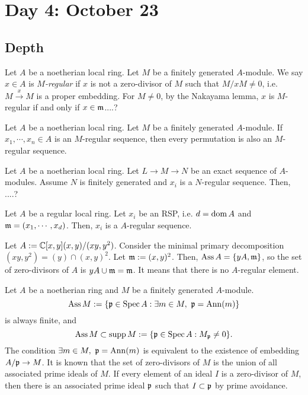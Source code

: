 \documentclass{../../../small}
\newcommand{\Ass}{\operatorname{Ass}}
\newcommand{\Ann}{\operatorname{Ann}}
\begin{document}
\newpage
\section{Day 4: October 23}


\subsection*{Depth}

\begin{defn*}[4.1]
Let $A$ be a noetherian local ring.
Let $M$ be a finitely generated $A$-module.
We say $x\in A$ is \emph{$M$-regular} if $x$ is not a zero-divisor of $M$ such that $M/xM\ne0$, i.e.~$M\xrightarrow{x}M$ is a proper embedding.
For $M\ne0$, by the Nakayama lemma, $x$ is $M$-regular if and only if $x\in\mathfrak{m}$....?

\end{defn*}
\begin{exe*}[4.2]
Let $A$ be a noetherian local ring.
Let $M$ be a finitely generated $A$-module.
If $x_1,\cdots,x_n\in A$ is an $M$-regular sequence, then every permutation is also an $M$-regular sequence.
\end{exe*}
\begin{prop*}[4.3]
Let $A$ be a noetherian local ring.
Let $L\to M\to N$ be an exact sequence of $A$-modules.
Assume $N$ is finitely generated and $x_i$ is a $N$-regular sequence.
Then, ....?
\end{prop*}

\begin{ex*}[4.4]
Let $A$ be a regular local ring.
Let $x_i$ be an RSP, i.e. $d=\operatorname{dom} A$ and $\mathfrak{m}=(x_1,\cdots,x_d)$.
Then, $x_i$ is a $A$-regular sequence.
\end{ex*}
\begin{ex*}[4.5]
Let $A:=\mathbb{C}[x,y](x,y)/(xy,y^2)$.
Consider the minimal primary decomposition $(xy,y^2)=(y)\cap(x,y)^2$.
Let $\mathfrak{m}:=(x,y)^2$.
Then, $\Ass A=\{yA,\fm\}$, so the set of zero-divisors of $A$ is $yA\cup\mathfrak{m}=\mathfrak{m}$.
It means that there is no $A$-regular element.
\end{ex*}

\begin{rmk*}[4.6]
Let $A$ be a noetherian ring and $M$ be a finitely generated $A$-module.
\[\Ass M:=\{\fp\in\Spec A:\exists m\in M,\ \fp=\Ann(m)\}\]
is always finite, and
\[\Ass M\subset\supp M:=\{\fp\in\Spec A:M_\fp\ne0\}.\]
The condition $\exists m\in M,\ \fp=\Ann(m)$ is equivalent to the existence of embedding $A/\mathfrak{p}\to M$.
It is known that the set of zero-divisors of $M$ is the union of all associated prime ideals of $M$.
If every element of an ideal $I$ is a zero-divisor of $M$, then there is an associated prime ideal $\mathfrak{p}$ such that $I\subset\mathfrak{p}$ by prime avoidance.
\end{rmk*}
\end{document}
